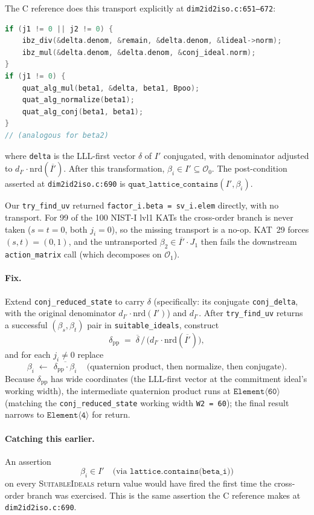 The C reference does this transport explicitly at
\texttt{dim2id2iso.c:651--672}:
\begin{lstlisting}[language=C]
if (j1 != 0 || j2 != 0) {
    ibz_div(&delta.denom, &remain, &delta.denom, &lideal->norm);
    ibz_mul(&delta.denom, &delta.denom, &conj_ideal.norm);
}
if (j1 != 0) {
    quat_alg_mul(beta1, &delta, beta1, Bpoo);
    quat_alg_normalize(beta1);
    quat_alg_conj(beta1, beta1);
}
// (analogous for beta2)
\end{lstlisting}
where \texttt{delta} is the LLL-first vector $\delta$ of $I'$
conjugated, with denominator adjusted to $d_{I'} \cdot
\mathrm{nrd}(\overline{I'})$.  After this transformation,
$\beta_i \in I' \subseteq \mathcal{O}_0$.  The post-condition
asserted at \texttt{dim2id2iso.c:690} is
$\mathtt{quat\_lattice\_contains}(I', \beta_i)$.

Our \texttt{try\_find\_uv} returned \texttt{factor\_i.beta =
sv\_i.elem} directly, with no transport.  For 99 of the 100
NIST-I lvl1 KATs the cross-order branch is never taken
($s = t = 0$, both $j_i = 0$), so the missing transport is a
no-op.  KAT~29 forces $(s, t) = (0, 1)$, and the untransported
$\beta_2 \in \overline{I'} \cdot J_1$ then fails the
downstream \texttt{action\_matrix} call (which decomposes on
$\mathcal{O}_1$).

\paragraph{Fix.}  Extend \texttt{conj\_reduced\_state} to carry
$\delta$ (specifically: its conjugate \texttt{conj\_delta}, with
the original denominator $d_{I'} \cdot \mathrm{nrd}(I')$) and
$d_{I'}$.  After \texttt{try\_find\_uv} returns a successful
$(\beta_s, \beta_t)$ pair in \texttt{suitable\_ideals},
construct
\[
  \delta_{\mathrm{pp}} \;=\; \overline{\delta} \,\Big/\,
  \bigl( d_{I'} \cdot \mathrm{nrd}(\overline{I'}) \bigr),
\]
and for each $j_i \neq 0$ replace
\[
  \beta_i \;\longleftarrow\;
  \overline{\,\delta_{\mathrm{pp}} \cdot \beta_i\,}
  \quad\text{(quaternion product, then normalize, then conjugate).}
\]
Because $\delta_{\mathrm{pp}}$ has wide coordinates (the
LLL-first vector at the commitment ideal's working width), the
intermediate quaternion product runs at
$\mathtt{Element\langle 60 \rangle}$ (matching the
\texttt{conj\_reduced\_state} working width
\texttt{W2 = 60}); the final result narrows to
$\mathtt{Element\langle 4\rangle}$ for return.

\paragraph{Catching this earlier.}  An assertion
\[
  \beta_i \in I' \quad\text{(via } \texttt{lattice.contains(beta\_i)}\text{)}
\]
on every \textsc{SuitableIdeals} return value would have
fired the first time the cross-order branch was exercised.
This is the same assertion the C reference makes at
\texttt{dim2id2iso.c:690}.

